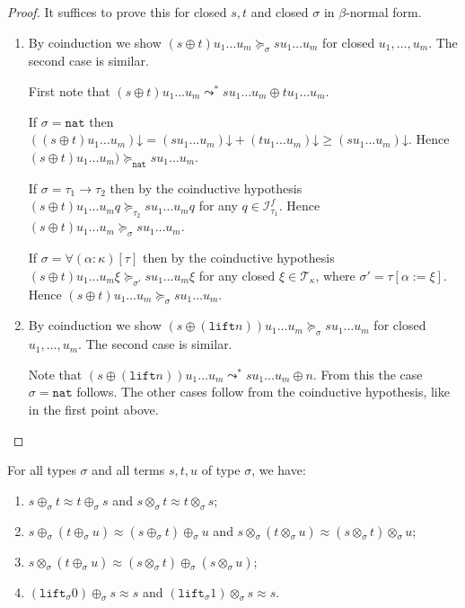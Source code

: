\documentclass[a4paper,UKenglish,cleveref,autoref,numberwithinsect]{lipics-v2019}
\theoremstyle{definition}
\newcommand{\Iterms}{\mathcal{I}}
\newcommand{\arrtype}{\rightarrow}
\newcommand{\subst}[2]{#1:=#2}
\newcommand{\nat}{\mathtt{nat}}
\newcommand{\lift}{\mathtt{lift}}
\newcommand{\Tc}{\mathcal{T}}
\newcommand{\da}{\mathord{\downarrow}}
\begin{document}
\begin{proof}
  It suffices to prove this for closed $s,t$ and closed $\sigma$ in
  $\beta$-normal form.
  \begin{enumerate}
  \item By coinduction we show $(s \oplus t) u_1 \ldots u_m
    \succeq_\sigma s u_1 \ldots u_m$ for closed $u_1,\ldots,u_m$. The
    second case is similar.

    First note that $(s \oplus t) u_1 \ldots u_m \leadsto^* s u_1
    \ldots u_m \oplus t u_1 \ldots u_m$.

    If $\sigma = \nat$ then $((s \oplus t) u_1 \ldots u_m)\da = (s u_1
    \ldots u_m)\da + (t u_1 \ldots u_m)\da \ge (s u_1 \ldots
    u_m)\da$. Hence $(s \oplus t) u_1 \ldots u_m) \succeq_\nat s u_1
    \ldots u_m$.

    If $\sigma = \tau_1\arrtype\tau_2$ then by the coinductive
    hypothesis $(s \oplus t) u_1 \ldots u_m q \succeq_{\tau_2} s u_1
    \ldots u_m q$ for any $q \in \Iterms_{\tau_1}^f$. Hence $(s \oplus
    t) u_1 \ldots u_m \succeq_\sigma s u_1 \ldots u_m$.

    If $\sigma = \forall(\alpha:\kappa)[\tau]$ then by the coinductive
    hypothesis $(s \oplus t) u_1 \ldots u_m \xi \succeq_{\sigma'} s
    u_1 \ldots u_m \xi$ for any closed $\xi \in \Tc_\kappa$, where
    $\sigma' = \tau[\subst{\alpha}{\xi}]$. Hence $(s \oplus t) u_1
    \ldots u_m \succeq_\sigma s u_1 \ldots u_m$.
  \item By coinduction we show $(s \oplus (\lift n)) u_1 \ldots u_m
    \succeq_\sigma s u_1 \ldots u_m$ for closed $u_1,\ldots,u_m$. The
    second case is similar.

    Note that $(s \oplus (\lift n)) u_1 \ldots u_m \leadsto^* s u_1
    \ldots u_m \oplus n$. From this the case $\sigma=\nat$
    follows. The other cases follow from the coinductive hypothesis,
    like in the first point above.\qedhere
  \end{enumerate}
\end{proof}

{ \renewcommand{\thelemma}{\ref{lem:approxproperties}}
\begin{lemma}
For all types $\sigma$ and all terms $s,t,u$ of type $\sigma$, we
have:
\begin{enumerate}
\item $s \oplus_\sigma t \approx t \oplus_\sigma s$ and $s
  \otimes_\sigma t \approx t \otimes_\sigma s$;
\item $s \oplus_\sigma (t \oplus_\sigma u) \approx (s \oplus_\sigma t)
  \oplus_\sigma u$ and $s \otimes_\sigma (t \otimes_\sigma u) \approx
  (s \otimes_\sigma t) \otimes_\sigma u$;
\item $s \otimes_\sigma (t \oplus_\sigma u) \approx (s \otimes_\sigma
  t) \oplus_\sigma (s \otimes_\sigma u)$;
\item $(\lift_\sigma 0) \oplus_\sigma s \approx s$ and $(\lift_\sigma
  1) \otimes_\sigma s \approx s$.
\end{enumerate}
\end{lemma}
\addtocounter{theorem}{-1}}
\end{document}
